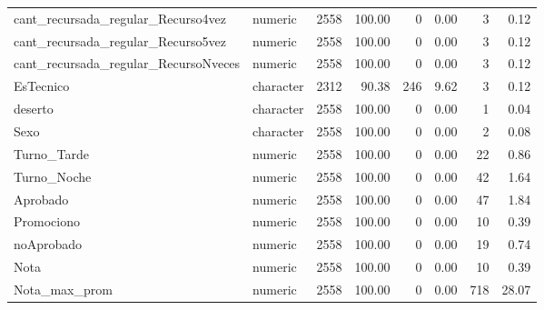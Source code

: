 \begin{table}[!h]
{\begin{tabular}[t]{llrrrrrr}
			cant\_recursada\_regular\_Recurso4vez & numeric & 2558 & 100.00 & 0 & 0.00 & 3 & 0.12\\
			\rowcolor{gray!6}  cant\_recursada\_regular\_Recurso5vez & numeric & 2558 & 100.00 & 0 & 0.00 & 3 & 0.12\\
			\addlinespace
			cant\_recursada\_regular\_RecursoNveces & numeric & 2558 & 100.00 & 0 & 0.00 & 3 & 0.12\\
			\rowcolor{gray!6}  EsTecnico & character & 2312 & 90.38 & 246 & 9.62 & 3 & 0.12\\
			deserto & character & 2558 & 100.00 & 0 & 0.00 & 1 & 0.04\\
			\rowcolor{gray!6}  Sexo & character & 2558 & 100.00 & 0 & 0.00 & 2 & 0.08\\
			Turno\_Tarde & numeric & 2558 & 100.00 & 0 & 0.00 & 22 & 0.86\\
			\addlinespace
			\rowcolor{gray!6}  Turno\_Noche & numeric & 2558 & 100.00 & 0 & 0.00 & 42 & 1.64\\
			Aprobado & numeric & 2558 & 100.00 & 0 & 0.00 & 47 & 1.84\\
			\rowcolor{gray!6}  Promociono & numeric & 2558 & 100.00 & 0 & 0.00 & 10 & 0.39\\
			noAprobado & numeric & 2558 & 100.00 & 0 & 0.00 & 19 & 0.74\\
			\rowcolor{gray!6}  Nota & numeric & 2558 & 100.00 & 0 & 0.00 & 10 & 0.39\\
			\addlinespace
			Nota\_max\_prom & numeric & 2558 & 100.00 & 0 & 0.00 & 718 & 28.07\\
			\bottomrule
	\end{tabular}}
\end{table}